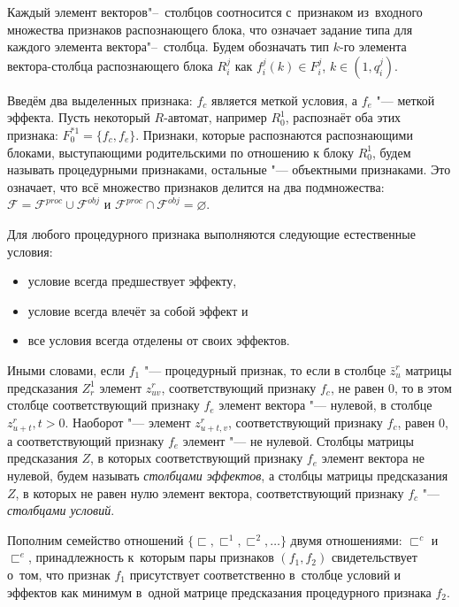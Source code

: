 \documentclass[a4paper, 12pt]{article}
\theoremstyle{plain}
\begin{document}
		Каждый элемент векторов"--~столбцов соотносится с~признаком из~входного множества признаков распознающего блока, что означает задание типа для каждого элемента вектора"--~столбца. Будем обозначать тип $k$-го элемента вектора-столбца распознающего блока $R_i^j$ как $f_i^j(k)\in F_i^j$, $k\in(1,q_i^j)$. 
		
		Введём два выделенных признака: $f_c$ является меткой условия, а $f_e$ "--- меткой эффекта. Пусть некоторый $R$-автомат, например $R_0^1$, распознаёт оба этих признака: $F_0^{*1}=\{f_c,f_e\}$. Признаки, которые распознаются распознающими блоками, выступающими родительскими по отношению к блоку $R_0^1$, будем называть процедурными признаками, остальные "--- объектными признаками. Это означает, что всё множество признаков делится на два подмножества: $\mathcal F=\mathcal F^{proc}\cup\mathcal F^{obj}$ и $\mathcal F^{proc}\cap\mathcal F^{obj}=\varnothing$.
		
		Для любого процедурного признака выполняются следующие естественные условия:
		\begin{itemize}
			\item условие всегда предшествует эффекту,
			\item условие всегда влечёт за собой эффект и
			\item все условия всегда отделены от своих эффектов.
		\end{itemize}
		
		Иными словами, если $f_1$ "--- процедурный признак, то если в столбце $\bar z_u^r$ матрицы предсказания $Z_r^1$ элемент $z_{uv}^r$, соответствующий признаку $f_c$, не равен $0$, то в этом столбце соответствующий признаку $f_e$ элемент вектора "--- нулевой, в столбце $z_{u+t}^r, t>0$. Наоборот "--- элемент $z_{u+t,v}^r$, соответствующий признаку $f_c$, равен $0$, а соответствующий признаку $f_e$ элемент "--- не нулевой. Столбцы матрицы предсказания $Z$, в которых соответствующий признаку $f_e$ элемент вектора не нулевой, будем называть \textit{столбцами эффектов}, а столбцы матрицы предсказания $Z$, в которых не равен нулю элемент вектора, соответствующий признаку $f_c$ "--- \textit{столбцами условий}. 
		
		Пополним семейство отношений $\{\sqsubset,\sqsubset^1,\sqsubset^2,\dots\}$ двумя отношениями: $\sqsubset^c$ и $\sqsubset^e$, принадлежность к~которым пары признаков $(f_1,f_2)$ свидетельствует о~том, что признак $f_1$ присутствует соответственно в~столбце условий и эффектов как минимум в~одной матрице предсказания процедурного признака $f_2$.
		
\end{document}
